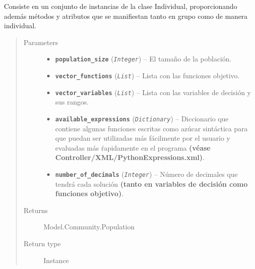 \documentclass[letterpaper,10pt,english]{sphinxmanual}
\begin{document}
\begin{fulllineitems}
\label{Model/Community/Population/Population:Model.Community.Population.Population.Population}
Consiste en un conjunto de instancias de la clase Individual, proporcionando además métodos y atributos que 
se manifiestan tanto en grupo como de manera individual.
\begin{quote}\begin{description}
\item[{Parameters}] \leavevmode\begin{itemize}
\item {} 
\textbf{\texttt{population\_size}} (\emph{\texttt{Integer}}) -- El tamaño de la población.

\item {} 
\textbf{\texttt{vector\_functions}} (\emph{\texttt{List}}) -- Lista con las funciones objetivo.

\item {} 
\textbf{\texttt{vector\_variables}} (\emph{\texttt{List}}) -- Lista con las variables de decisión y sus rangos.

\item {} 
\textbf{\texttt{available\_expressions}} (\emph{\texttt{Dictionary}}) -- Diccionario que contiene algunas funciones escritas como azúcar sintáctica
para que puedan ser utilizadas más fácilmente por el usuario y evaluadas
más ŕapidamente en el programa \textbf{(véase Controller/XML/PythonExpressions.xml)}.

\item {} 
\textbf{\texttt{number\_of\_decimals}} (\emph{\texttt{Integer}}) -- Número de decimales que tendrá cada solución \textbf{(tanto en variables de decisión como
funciones objetivo)}.

\end{itemize}

\item[{Returns}] \leavevmode
Model.Community.Population

\item[{Return type}] \leavevmode
Instance

\end{description}\end{quote}


\end{fulllineitems}
\end{document}
